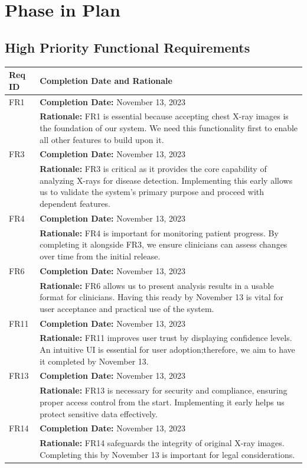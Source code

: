 \documentclass[12pt]{article}
\begin{document}
\section{Phase in Plan}    
\subsection{High Priority Functional Requirements}
\begin{table}[H]
  \label{TblHighPriorityFRs}
  \begin{tabular}{p{}|p{}}
  \toprule
  \textbf{Req ID} & \textbf{Completion Date and Rationale} \\
  \midrule
  FR1 & \textbf{Completion Date:} November 13, 2023\\
      & \textbf{Rationale:} FR1 is essential because accepting chest X-ray images is the foundation of our system. We need this functionality first to enable all other features to build upon it. \\
  \midrule
  FR3 & \textbf{Completion Date:} November 13, 2023\\
      & \textbf{Rationale:} FR3 is critical as it provides the core capability of analyzing X-rays for disease detection. Implementing this early allows us to validate the system's primary purpose and proceed with dependent features. \\
  \midrule
  FR4 & \textbf{Completion Date:} November 13, 2023\\
      & \textbf{Rationale:} FR4 is important for monitoring patient progress. By completing it alongside FR3, we ensure clinicians can assess changes over time from the initial release. \\
  \midrule
  FR6 & \textbf{Completion Date:} November 13, 2023\\
      & \textbf{Rationale:} FR6 allows us to present analysis results in a usable format for clinicians. Having this ready by November 13 is vital for user acceptance and practical use of the system. \\
  \midrule
  FR11 & \textbf{Completion Date:} November 13, 2023\\
       & \textbf{Rationale:} FR11 improves user trust by displaying confidence levels. An intuitive UI is essential for user adoption;therefore, we aim to have it completed by November 13. \\
  \midrule
  FR13 & \textbf{Completion Date:} November 13, 2023\\
       & \textbf{Rationale:} FR13 is necessary for security and compliance, ensuring proper access control from the start. Implementing it early helps us protect sensitive data effectively. \\
  \midrule
  FR14 & \textbf{Completion Date:} November 13, 2023\\
       & \textbf{Rationale:} FR14 safeguards the integrity of original X-ray images. Completing this by November 13 is important for legal considerations. \\
  \bottomrule
  \end{tabular}
  \end{table}
\end{document}
